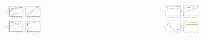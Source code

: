 \documentclass[a0paper,portrait,margin=0pt, colspace=24pt,subcolspace=0pt,blockverticalspace=36pt,innermargin=50pt]{tikzposter}
\begin{document}
\begin{columns}
{\vspace*{1em} 

%


\begin{center}
\includegraphics[width=0.25\textwidth]{figures/e1} \label{fig:cat}
\end{center}

\vspace*{1em} 

\begin{center}
\includegraphics[width=0.25\textwidth]{figures/e2} \label{fig:str}
\end{center}






}
\end{columns}
\end{document}
